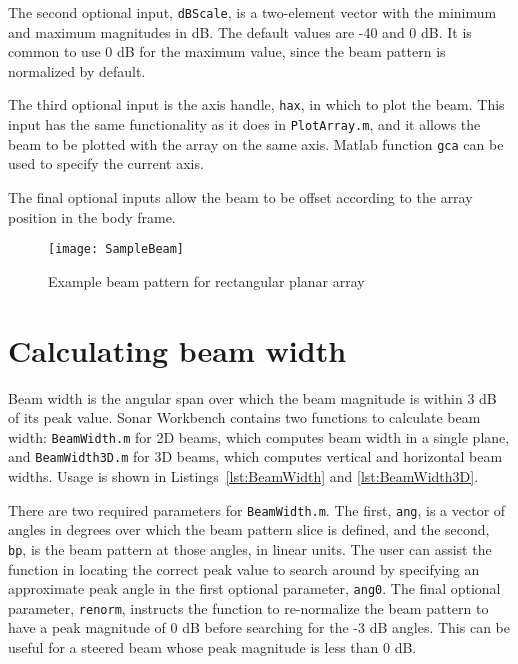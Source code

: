 The second optional input, \texttt{dBScale}, is a two-element vector with the minimum and maximum magnitudes in dB. The default values are -40 and 0 dB. It is common to use 0 dB for the maximum value, since the beam pattern is normalized by default.

The third optional input is the axis handle, \texttt{hax}, in which to plot the beam. This input has the same functionality as it does in \texttt{PlotArray.m}, and it allows the beam to be plotted with the array on the same axis. Matlab function \texttt{gca} can be used to specify the current axis.

The final optional inputs allow the beam to be offset according to the array position in the body frame. 



\clearpage
\begin{sidewaysfigure}[!ht]
\begin{center}
\texttt{[image: SampleBeam]}
\caption{\label{fig:SampleBeam}Example beam pattern for rectangular planar array}
\end{center}
\end{sidewaysfigure}

\clearpage
\section{Calculating beam width}

Beam width is the angular span over which the beam magnitude is within 3 dB of its peak value. Sonar Workbench contains two functions to calculate beam width: \texttt{BeamWidth.m} for 2D beams, which computes beam width in a single plane, and \texttt{BeamWidth3D.m} for 3D beams, which computes vertical and horizontal beam widths. Usage is shown in Listings~\ref{lst:BeamWidth} and \ref{lst:BeamWidth3D}.





There are two required parameters for \texttt{BeamWidth.m}. The first, \texttt{ang}, is a vector of angles in degrees over which the beam pattern slice is defined, and the second, \texttt{bp}, is the beam pattern at those angles, in linear units. The user can assist the function in locating the correct peak value to search around by specifying an approximate peak angle in the first optional parameter, \texttt{ang0}. The final optional parameter, \texttt{renorm}, instructs the function to re-normalize the beam pattern to have a peak magnitude of 0 dB before searching for the -3 dB angles. This can be useful for a steered beam whose peak magnitude is less than 0 dB. 

